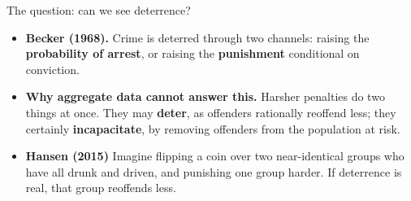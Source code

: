 \documentclass[
  11pt,
  ignorenonframetext,
  aspectratio=169,
]{beamer}
\providecommand{\tightlist}{%
  \setlength{\itemsep}{0pt}\setlength{\parskip}{0pt}}
\begin{document}
\begin{frame}{The question: can we see deterrence?}
\protect{}\label{the-question-can-we-see-deterrence}
\begin{itemize}
\tightlist
\item
  \textbf{Becker (1968).} Crime is deterred through two channels:
  raising the \textbf{probability of arrest}, or raising the
  \textbf{punishment} conditional on conviction.
\item
  \textbf{Why aggregate data cannot answer this.} Harsher penalties do
  two things at once. They may \textbf{deter}, as offenders rationally
  reoffend less; they certainly \textbf{incapacitate}, by removing
  offenders from the population at risk.
\item
  \textbf{Hansen (2015)} Imagine flipping a coin over two near-identical
  groups who have all drunk and driven, and punishing one group harder.
  If deterrence is real, that group reoffends less.
\end{itemize}
\end{frame}
\end{document}
